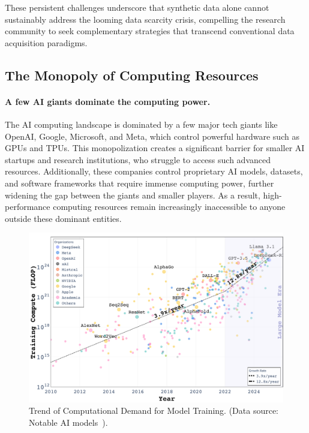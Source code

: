 These persistent challenges underscore that synthetic data alone cannot sustainably address the looming data scarcity crisis, compelling the research community to seek complementary strategies that transcend conventional data acquisition paradigms.





\subsection{The Monopoly of Computing Resources}\label{subsec:compute_monopoly}
\paragraph{A few AI giants dominate the computing power.}
The AI computing landscape is dominated by a few major tech giants like OpenAI, Google, Microsoft, and Meta, which control powerful hardware such as GPUs and TPUs. This monopolization creates a significant barrier for smaller AI startups and research institutions, who struggle to access such advanced resources. Additionally, these companies control proprietary AI models, datasets, and software frameworks that require immense computing power, further widening the gap between the giants and smaller players. As a result, high-performance computing resources remain increasingly inaccessible to anyone outside these dominant entities.

\begin{figure}
    \centering
\includegraphics[width=\linewidth]{./figs/ai_compute_trend.pdf}
\vspace{-20pt}
    \caption{Trend of Computational Demand for Model Training. (Data source: Notable AI models~\cite{epoch2023trendsinmachinelearninghardware}).}
    \label{fig:model_comput_trend}
\end{figure}


